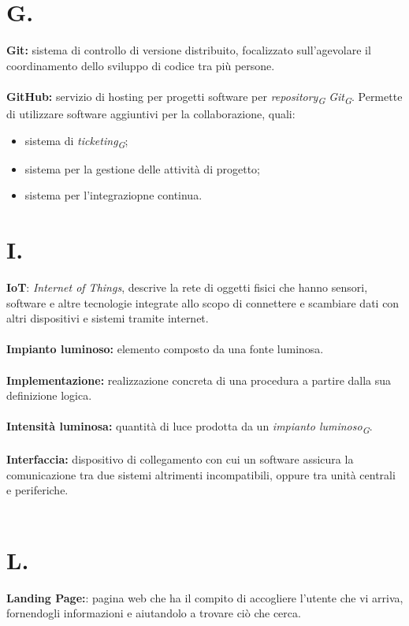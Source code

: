 \documentclass[a4paper, 12pt]{article}
\begin{document}
\newpage
\section*{G.}
\textbf{Git:} sistema di controllo di versione distribuito, focalizzato
sull'agevolare il coordinamento dello sviluppo di codice tra più persone. \\ \\
\textbf{GitHub:} servizio di hosting per progetti software per
\textit{repository\textsubscript{G}} \textit{Git\textsubscript{G}}. Permette di
utilizzare software aggiuntivi per la collaborazione, quali:
\begin{itemize}
    \item sistema di \textit{ticketing\textsubscript{G}};
    \item sistema per la gestione delle attività di progetto;
    \item sistema per l'integraziopne continua.
\end{itemize}
\newpage

\section*{I.}
\textbf{IoT}: \textit{Internet of Things}, descrive la rete di oggetti fisici che hanno sensori, software e altre tecnologie integrate allo scopo di connettere e scambiare dati con altri dispositivi e sistemi tramite internet. \\ \\
\textbf{Impianto luminoso:} elemento composto da una fonte luminosa. \\ \\
\textbf{Implementazione:} realizzazione concreta di una procedura a partire dalla sua definizione logica. \\ \\
\textbf{Intensità luminosa:} quantità di luce prodotta da un \textit{impianto luminoso\textsubscript{G}}. \\ \\
\textbf{Interfaccia:} dispositivo di collegamento con cui un software assicura la comunicazione tra due sistemi altrimenti incompatibili, oppure tra unità centrali e periferiche. \\ \\

\newpage
\section*{L.}
\textbf{Landing Page:}: pagina web che ha il compito di accogliere l'utente che vi arriva, fornendogli informazioni e aiutandolo a trovare ciò che cerca. \\ \\
\end{document}
